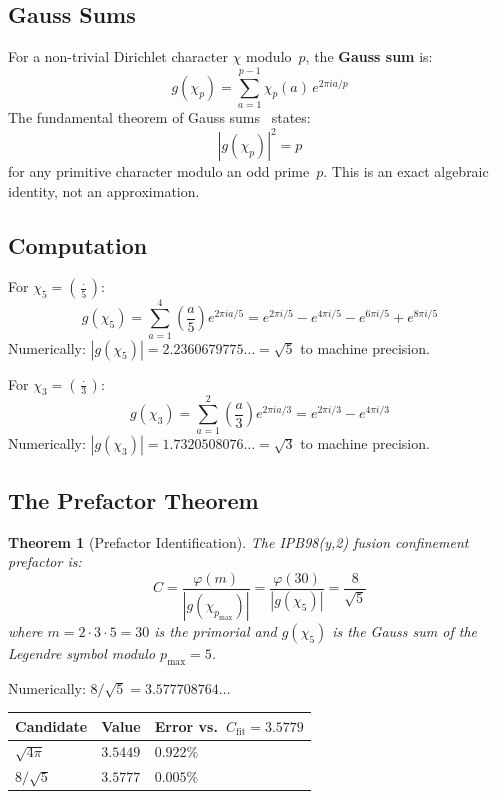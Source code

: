 \documentclass[11pt,letterpaper]{article}
\newtheorem{theorem}{Theorem}[section]
\theoremstyle{definition}
\begin{document}
\subsection{Gauss Sums}

For a non-trivial Dirichlet character $\chi$ modulo~$p$, the \textbf{Gauss sum} is:
\[
g(\chi_p) = \sum_{a=1}^{p-1} \chi_p(a) \, e^{2\pi i a / p}
\]
The fundamental theorem of Gauss sums~\cite{gauss1801, ireland2010} states:
\[
|g(\chi_p)|^2 = p
\]
for any primitive character modulo an odd prime~$p$. This is an exact algebraic identity, not an approximation.

\subsection{Computation}

For $\chi_5 = \left(\frac{\cdot}{5}\right)$:
\[
g(\chi_5) = \sum_{a=1}^{4} \left(\frac{a}{5}\right) e^{2\pi i a/5}
           = e^{2\pi i/5} - e^{4\pi i/5} - e^{6\pi i/5} + e^{8\pi i/5}
\]
Numerically: $|g(\chi_5)| = 2.2360679775\ldots = \sqrt{5}$ to machine precision.

For $\chi_3 = \left(\frac{\cdot}{3}\right)$:
\[
g(\chi_3) = \sum_{a=1}^{2} \left(\frac{a}{3}\right) e^{2\pi i a/3}
           = e^{2\pi i/3} - e^{4\pi i/3}
\]
Numerically: $|g(\chi_3)| = 1.7320508076\ldots = \sqrt{3}$ to machine precision.

\subsection{The Prefactor Theorem}

\begin{theorem}[Prefactor Identification]
The IPB98(y,2) fusion confinement prefactor is:
\[
C = \frac{\varphi(m)}{|g(\chi_{p_{\text{max}}})|} = \frac{\varphi(30)}{|g(\chi_5)|} = \frac{8}{\sqrt{5}}
\]
where $m = 2 \cdot 3 \cdot 5 = 30$ is the primorial and $g(\chi_5)$ is the Gauss sum of the Legendre symbol modulo $p_{\text{max}} = 5$.
\end{theorem}

Numerically: $8/\sqrt{5} = 3.577708764\ldots$

\begin{center}
\begin{tabular}{@{}lll@{}}
\toprule
Candidate & Value & Error vs.\ $C_{\text{fit}} = 3.5779$ \\
\midrule
$\sqrt{4\pi}$ & $3.5449$ & $0.922\%$ \\
$8/\sqrt{5}$  & $3.5777$ & $0.005\%$ \\
\bottomrule
\end{tabular}
\end{center}
\end{document}
